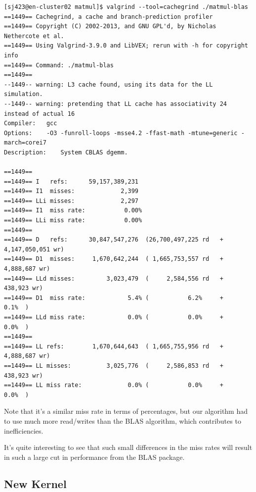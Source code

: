 \documentclass{article}
\begin{document}
    \begin{lstlisting}
[sj423@en-cluster02 matmul]$ valgrind --tool=cachegrind ./matmul-blas 
==1449== Cachegrind, a cache and branch-prediction profiler
==1449== Copyright (C) 2002-2013, and GNU GPL'd, by Nicholas Nethercote et al.
==1449== Using Valgrind-3.9.0 and LibVEX; rerun with -h for copyright info
==1449== Command: ./matmul-blas
==1449== 
--1449-- warning: L3 cache found, using its data for the LL simulation.
--1449-- warning: pretending that LL cache has associativity 24 instead of actual 16
Compiler:	gcc
Options:	-O3 -funroll-loops -msse4.2 -ffast-math -mtune=generic -march=corei7
Description:	System CBLAS dgemm.

==1449== 
==1449== I   refs:      59,157,389,231
==1449== I1  misses:             2,399
==1449== LLi misses:             2,297
==1449== I1  miss rate:           0.00%
==1449== LLi miss rate:           0.00%
==1449== 
==1449== D   refs:      30,847,547,276  (26,700,497,225 rd   + 4,147,050,051 wr)
==1449== D1  misses:     1,670,642,244  ( 1,665,753,557 rd   +     4,888,687 wr)
==1449== LLd misses:         3,023,479  (     2,584,556 rd   +       438,923 wr)
==1449== D1  miss rate:            5.4% (           6.2%     +           0.1%  )
==1449== LLd miss rate:            0.0% (           0.0%     +           0.0%  )
==1449== 
==1449== LL refs:        1,670,644,643  ( 1,665,755,956 rd   +     4,888,687 wr)
==1449== LL misses:          3,025,776  (     2,586,853 rd   +       438,923 wr)
==1449== LL miss rate:             0.0% (           0.0%     +           0.0%  )
    \end{lstlisting}

    Note that it's a similar miss rate in terms of percentages, but our algorithm had to
    use much more read/writes than the BLAS algorithm, which contributes to inefficiencies.

    It's quite interesting to see that such small differences in the miss rates will result in such a large cut in performance
    from the BLAS package.

    \subsection{New Kernel}
\end{document}
